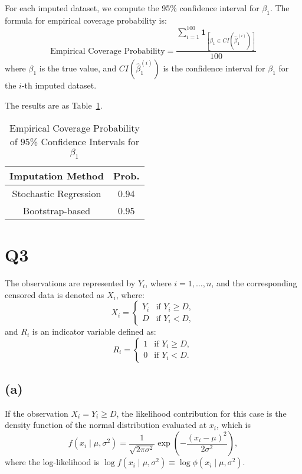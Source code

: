 \documentclass{article}
\begin{document}
For each imputed dataset, we compute the 95\% confidence interval for \(\beta_1\). The formula for empirical coverage probability is:
\[
\text{Empirical Coverage Probability} = \frac{\sum_{i=1}^{100} \mathbf{1}_{[\beta_1 \in CI(\hat{\beta}_1^{(i)})]}}{100}
\]
where \(\beta_1\) is the true value, and \(CI(\hat{\beta}_1^{(i)})\) is the confidence interval for \(\beta_1\) for the \(i\)-th imputed dataset.

The results are as Table~\ref{tab:q2}.
\begin{table}[h]
\centering
\caption{Empirical Coverage Probability of 95\% Confidence Intervals for \(\beta_1\)}
\label{tab:q2}
\vspace{0.2cm}
\begin{tabular}{cc}
\toprule
Imputation Method & Prob. \\
\midrule
Stochastic Regression & 0.94 \\
Bootstrap-based & 0.95 \\
\bottomrule
\end{tabular}
\end{table}

\newpage

\section{Q3}
The observations are represented by \( Y_i \), where \( i = 1, \dots, n \), and the corresponding censored data is denoted as \( X_i \), where:
\[
X_i = \begin{cases}
Y_i & \textrm{if } Y_i \geq D, \\
D & \textrm{if } Y_i < D,
\end{cases}
\]
and \( R_i \) is an indicator variable defined as:
\[
R_i = \begin{cases}
1 & \text{if } Y_i \geq D, \\
0 & \text{if } Y_i < D.
\end{cases}
\]

\subsection{(a)}
If the observation \( X_i = Y_i \geq D \), the likelihood contribution for this case is the density function of the normal distribution evaluated at \( x_i \), which is
   \[
   f(x_i \mid \mu, \sigma^2) = \frac{1}{\sqrt{2\pi \sigma^2}} \exp\left( -\frac{(x_i - \mu)^2}{2 \sigma^2} \right),
   \]
   where the log-likelihood is $\log f(x_i \mid \mu, \sigma^2) \equiv \log \phi(x_i \mid \mu, \sigma^2)$.
\end{document}

